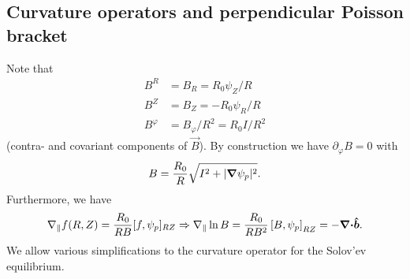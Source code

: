 \subsection{Curvature operators and perpendicular Poisson bracket}
Note that
\begin{align}
    B^R&=B_R = R_0\psi_Z/R \\
    B^Z&=B_Z = - R_0\psi_R/R \\
    B^\varphi &= B_\varphi/R^2 = R_0I/R^2
\end{align}
(contra- and covariant components of $\vec B$).
By construction we have $\partial_\varphi B = 0$ with
\begin{align}
  B = \frac{R_0}{R}\sqrt{ {I^2 + |{\boldsymbol{\nabla}} \psi_p|^2}}.
    \label{}
\end{align}
Furthermore, we have
\begin{align}
  \nabla_\parallel f(R,Z) = \frac{R_0}{RB}[f,\psi_p]_{RZ}\Rightarrow \nabla_\parallel \ln B = \frac{R_0}{RB^2}\left[B, \psi_p\right]_{RZ} = -{\boldsymbol{{\boldsymbol{\nabla}}\cdot}}\bm{\hat{b}}.
\end{align}
We allow various simplifications to the curvature operator
for the Solov'ev equilibrium.


